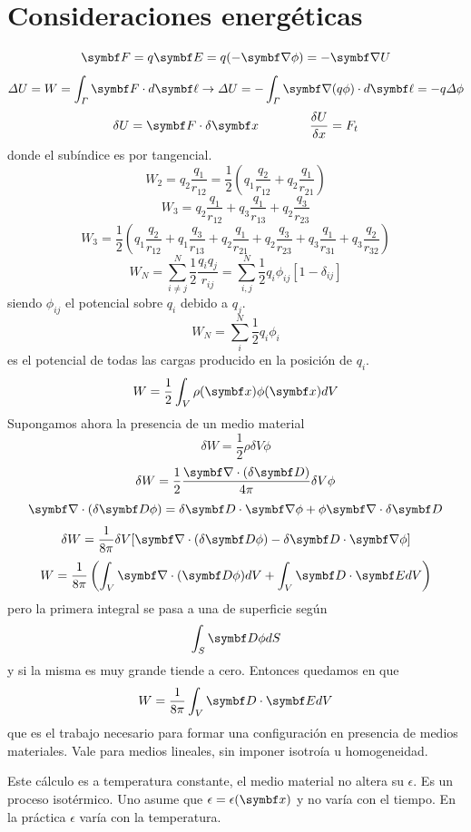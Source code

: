 \documentclass[10pt,oneside]{CBFT_book}
\begin{document}
\section{Consideraciones energéticas}

\[
	\vb{F} = q \vb{E} = q (-\Nabla\phi) = - \Nabla U
\]
\[
	\Delta U = W = \int_\Gamma \vb{F}\cdot d\vb{\ell} \rightarrow \Delta U = 
	- \int_\Gamma \Nabla (q\phi) \cdot d\vb{\ell} = -q \Delta \phi
\]
\[
	\delta U = \vb{F}\cdot\delta\vb{x} \qquad\qquad  \frac{\delta U}{\delta x} = F_t
\]
donde el subíndice es por tangencial.
\[
	W_2 = q_2 \frac{q_1}{r_{12}} = \frac{1}{2}\left( q_1 \frac{q_2}{r_{12}} + 
		q_2 \frac{q_1}{r_{21}} \right)
\]
\[
	W_3 = q_2 \frac{q_1}{r_{12}} + q_3 \frac{q_1}{r_{13}} + q_2 \frac{q_3}{r_{23}}
\]
\[
	W_3 = \frac{1}{2}\left( q_1 \frac{q_2}{r_{12}} + q_1 \frac{q_3}{r_{13}} + q_2 \frac{q_1}{r_{21}}
		+ q_2 \frac{q_3}{r_{23}} + q_3 \frac{q_1}{r_{31}} + q_3 \frac{q_2}{r_{32}} \right)
\]
\[
	W_N = \sum_{i\neq j}^N \frac{1}{2}\frac{q_i q_j}{r_{ij}} =
	\sum_{i,j}^N \frac{1}{2} q_i \phi_{ij}[ 1 - \delta_{ij}]
\]
siendo $\phi_{ij}$ el potencial sobre $q_i$ debido a $q_j$.
\[
	W_N = \sum_i^N \frac{1}{2} q_i \phi_i 
\]
es el potencial de todas las cargas producido en la posición de $q_i$.
\[
	W = \frac{1}{2} \int_V \rho(\vb{x}) \phi(\vb{x}) dV
\]
Supongamos ahora la presencia de un medio material 
\[
	\delta W = \frac{1}{2} \rho \delta V \phi
\]
\[
	\delta W = \frac{1}{2}\frac{\Nabla\cdot(\delta\vb{D})}{4\pi} \delta V \phi 
\]
\[
	\Nabla\cdot(\delta\vb{D}\phi) = \delta\vb{D} \cdot \Nabla\phi  + \phi \Nabla\cdot\delta\vb{D}
\]
\[
	\delta W = \frac{1}{8\pi} \delta V [\Nabla\cdot(\delta\vb{D}\phi) - \delta\vb{D} \cdot \Nabla\phi ]
\]
\[
	W = \frac{1}{8\pi}\left( \int_V \Nabla\cdot(\vb{D}\phi)dV + \int_V \vb{D}\cdot\vb{E} dV \right)
\]
pero la primera integral se pasa a una de superficie según
\[
	\int_S \vb{D}\phi dS
\]
y si la misma es muy grande tiende a cero. Entonces quedamos en que 
\[
	W = \frac{1}{8\pi} \int_V \vb{D}\cdot\vb{E} dV
\]
que es el trabajo necesario para formar una configuración en presencia de medios materiales. Vale
para medios lineales, sin imponer isotroía u homogeneidad.

Este cálculo es a temperatura constante, el medio material no altera su $\epsilon$.
Es un proceso isotérmico. Uno asume que $\epsilon=\epsilon(\vb{x})$ y no varía con el tiempo.
En la práctica $\epsilon$ varía con la temperatura.
\end{document}
